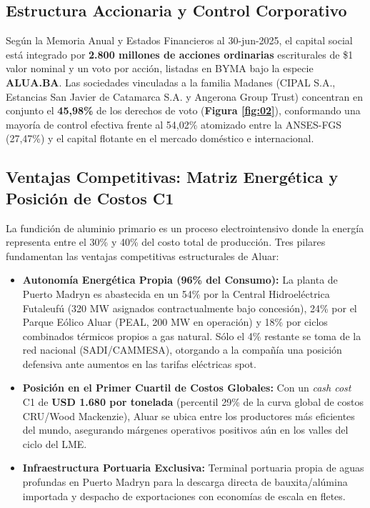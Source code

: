 \documentclass[10pt,a4paper]{article}
\begin{document}
\subsection{Estructura Accionaria y Control Corporativo}
Según la Memoria Anual y Estados Financieros al 30-jun-2025, el capital social está integrado por \textbf{2.800 millones de acciones ordinarias} escriturales de \$1 valor nominal y un voto por acción, listadas en BYMA bajo la especie \textbf{ALUA.BA}. Las sociedades vinculadas a la familia Madanes (CIPAL S.A., Estancias San Javier de Catamarca S.A. y Angerona Group Trust) concentran en conjunto el \textbf{45,98\%} de los derechos de voto (\textbf{Figura \ref{fig:02}}), conformando una mayoría de control efectiva frente al 54,02\% atomizado entre la ANSES-FGS (27,47\%) y el capital flotante en el mercado doméstico e internacional.

\subsection{Ventajas Competitivas: Matriz Energética y Posición de Costos C1}
La fundición de aluminio primario es un proceso electrointensivo donde la energía representa entre el 30\% y 40\% del costo total de producción. Tres pilares fundamentan las ventajas competitivas estructurales de Aluar:
\begin{itemize}
    \item \textbf{Autonomía Energética Propia (96\% del Consumo):} La planta de Puerto Madryn es abastecida en un 54\% por la Central Hidroeléctrica Futaleufú (320 MW asignados contractualmente bajo concesión), 24\% por el Parque Eólico Aluar (PEAL, 200 MW en operación) y 18\% por ciclos combinados térmicos propios a gas natural. Sólo el 4\% restante se toma de la red nacional (SADI/CAMMESA), otorgando a la compañía una posición defensiva ante aumentos en las tarifas eléctricas spot.
    \item \textbf{Posición en el Primer Cuartil de Costos Globales:} Con un \textit{cash cost} C1 de \textbf{USD 1.680 por tonelada} (percentil 29\% de la curva global de costos CRU/Wood Mackenzie), Aluar se ubica entre los productores más eficientes del mundo, asegurando márgenes operativos positivos aún en los valles del ciclo del LME.
    \item \textbf{Infraestructura Portuaria Exclusiva:} Terminal portuaria propia de aguas profundas en Puerto Madryn para la descarga directa de bauxita/alúmina importada y despacho de exportaciones con economías de escala en fletes.
\end{itemize}
\end{document}
